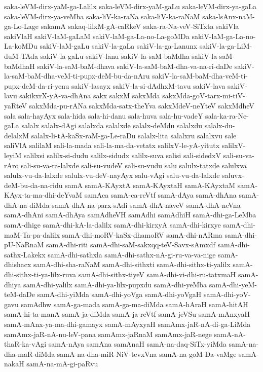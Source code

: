{saka-leVM-dirx-yaM-ga-Lalilx
saka-leVM-dirx-yaM-gaLu
saka-leVM-dirx-ya-gaLa
saka-leVM-dirx-ya-veMba
saka-liV-ka-raNa
saka-liV-ka-raNaM
saka-lsAnx-naM-ga-Lo-Lage
sakamA
sakaq-lilxM-gA-caRkeV
saka-ra-Na-veV-SiTxta
sakiVla
sakiVlaH
sakiV-laM-gaLaM
sakiV-laM-ga-La-no-La-goMDa
sakiV-laM-ga-La-no-La-koMDu
sakiV-laM-gaLu
sakiV-la-gaLa
sakiV-la-ga-Lanunx
sakiV-la-ga-LiM-duM-TAda
sakiV-la-gaLu
sakiV-lanu
sakiV-la-saM-baMdha
sakiV-la-saM-baMdhaH
sakiV-la-saM-baM-dhava
sakiV-la-saM-baM-dha-va-na-ri-daDe
sakiV-la-saM-baM-dha-veM-ti-pupx-deM-bu-da-nAru
sakiV-la-saM-baM-dha-veM-ti-pupx-deM-da-ri-yenu
sakiV-lasayx
sakiV-la-si-dAdhxM-tavu
sakiV-lava
sakiV-lavu
sakikxrX-yA-va-dhAna
sakx
sakxM
sakxMda
sakxMda-goV-tarx-mi-tiV-yaRteV
sakxMda-pu-rANa
sakxMda-satx-theYva
sakxMdeV-neYteV
sakxMdheV
sala
sala-hayAyx
sala-hida
sala-hi-danu
sala-huva
sala-hu-vadeY
sala-ka-ra-Ne-gaLa
salalx
salalx-dAgi
salalxda
salalxde
salalx-deMdu
salalxdu
salalx-du-delalxM
salalx-li-tA-kaSx-raM-ga-Le-raDu
salalx-lita
salalxru
salalxvu
sale
saliVlA
salilaM
sali-la-mada
sali-la-ma-da-vetatx
salilxV-le-yA-yitutx
salilxV-leyiM
salilxsi
salilx-si-dudu
salilx-sidudx
salilx-suva
salisi
sali-sidedxV
sali-su-va-rAro
sali-su-va-ra-lalxde
sali-su-vudeV
sali-su-vudu
salu
salulx-tatxde
salulxva
salulx-vu-da-lalxde
salulx-vu-deV-nayAyx
salu-vAgi
salu-vu-da-lalxde
saluvx-deM-bu-da-na-ridu
samA
samA-KAyxtA
samA-KAyxtaH
samA-KAyxtaM
samA-KAyx-ta-ma-dhi-deYvaM
samAca
samA-ca-reVtf
samA-dAya
samA-dhAna
samA-dhA-na-diMda
samA-dhA-na-parx-sAdi
samA-dhA-naveV
samA-dhA-neVna
samA-dhAni
samA-dhAya
samAdheVH
samAdhi
samAdhiH
samA-dhi-ga-LeMba
samA-dhige
samA-dhi-kA-la-dalilx
samA-dhi-kirxyA
samA-dhi-kirxye
samA-dhi-maM-Ta-pa-dalilx
samA-dhi-moRV-kaSx-dhamoRV
samA-dhi-nARma
samA-dhi-pU-NaRnaM
samA-dhi-riti
samA-dhi-saM-sakxqq-teV-Savx-sAmxdf
samA-dhi-sathx-Lakekx
samA-dhi-sathxla
samA-dhi-sathx-nA-gi-ru-va-va-nige
samA-dhishacx
samA-dhi-sha-raNaM
samA-dhi-sithxti
samA-dhi-sithx-ti-yalilx
samA-dhi-sithx-ti-ya-lilx-ruva
samA-dhi-sithx-tiyeV
samA-dhi-vi-dhi-ru-tatxmaH
samA-dhiya
samA-dhi-yalilx
samA-dhi-ya-lilx-pupxdu
samA-dhi-yeMba
samA-dhi-yeM-teM-daDe
samA-dhi-yiMda
samA-dhi-yoVga
samA-dhi-yoVgaH
samA-dhi-yoV-gavu
samAdhw
samA-ga-mada
samA-ga-ma-diMda
samA-hAraH
samA-hitAH
samA-hi-ta-manA
samA-ja-diMda
samA-ja-reVtf
samA-jeVSu
samA-mAnxyaH
samA-mAnx-ya-ma-dhi-gamayx
samA-mAyxyaH
samAmx-jaR-nA-di-ga-LiMda
samAmx-jaR-nA-nu-leV-pana
samAmx-jaRnaM
samAmx-jaR-nege
samA-nA-thaR-ka-vAgi
samA-nAya
samAna
samAnaH
samA-na-daq-SiTx-yiMda
samA-na-dha-maR-diMda
samA-na-dha-miR-NiV-tevxVna
samA-na-goM-Da-vaMge
samA-nakaH
samA-na-mA-gi-paRvu
}
